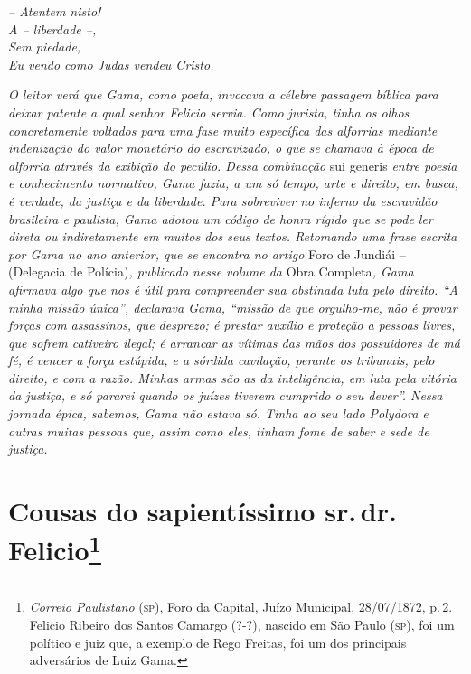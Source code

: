 \emph{-- Atentem nisto!\\
A -- liberdade --,\\
Sem piedade,\\
Eu vendo como Judas vendeu Cristo.}

\emph{O leitor verá que Gama, como poeta, invocava a célebre passagem
bíblica para deixar patente a qual senhor Felicio servia. Como jurista,
tinha os olhos concretamente voltados para uma fase muito específica das
alforrias mediante indenização do valor monetário do escravizado, o que
se chamava à época de alforria através da exibição do pecúlio. Dessa
combinação} sui generis \emph{entre poesia e conhecimento normativo,
Gama fazia, a um só tempo, arte e direito, em busca, é verdade, da
justiça e da liberdade. Para sobreviver no inferno da escravidão
brasileira e paulista, Gama adotou um código de honra rígido que se pode
ler direta ou indiretamente em muitos dos seus textos. Retomando uma
frase escrita por Gama no ano anterior, que se encontra no artigo} Foro
de Jundiái -- (Delegacia de Polícia)\emph{, publicado nesse volume da}
Obra Completa\emph{, Gama afirmava algo que nos é útil para compreender
sua obstinada luta pelo direito. ``A minha missão única'', declarava Gama,
``missão de que orgulho-me, não é provar forças com assassinos, que
desprezo; é prestar auxílio e proteção a pessoas livres, que sofrem
cativeiro ilegal; é arrancar as vítimas das mãos dos possuidores de má
fé, é vencer a força estúpida, e a sórdida cavilação, perante os
tribunais, pelo direito, e com a razão. Minhas armas são as da
inteligência, em luta pela vitória da justiça, e só pararei quando os
juízes tiverem cumprido o seu dever''. Nessa jornada épica, sabemos, Gama
não estava só. Tinha ao seu lado Polydora e outras muitas pessoas que,
assim como eles, tinham fome de saber e sede de justiça.}

\chapter{Cousas do sapientíssimo sr.\,dr.\,Felicio\footnote{
\emph{Correio Paulistano} (\textsc{sp}), Foro da Capital, Juízo
  Municipal, 28/07/1872, p.\,2. Felicio Ribeiro dos Santos Camargo (?-?),
  nascido em São Paulo (\textsc{sp}), foi um político e juiz que, a exemplo de
  Rego Freitas, foi um dos principais adversários de Luiz Gama.}} %

